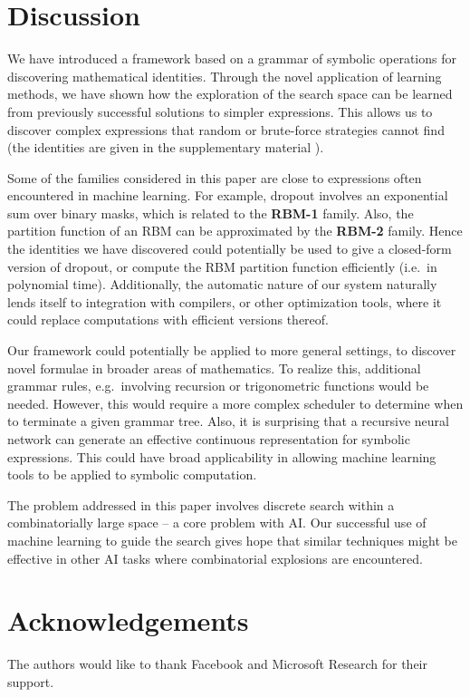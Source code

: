 \documentclass{article} %
\begin{document}
\vspace{-3mm}
\section{Discussion}
\vspace{-2mm}
\label{sec:discussion}
We have introduced a framework based on a grammar of symbolic
operations for discovering mathematical identities. Through the novel
application of learning methods, we have shown how the exploration of
the search space can be learned from previously successful solutions
to simpler expressions. This allows us to discover complex expressions
that random or brute-force strategies cannot find (the identities are
given in the supplementary material \cite{arxiv}). 

Some of the families considered in this paper are close to
expressions often encountered in machine learning. For example,
dropout involves an exponential sum over binary masks, which is
related to the {\bf RBM-1} family. Also, the partition function of an
RBM can be approximated by the {\bf RBM-2} family. Hence the identities
we have discovered could potentially be used to give a closed-form
version of dropout, or compute the RBM partition function efficiently
(i.e.~in polynomial time). 
Additionally, the automatic nature of our system naturally lends itself to
integration with compilers, or other optimization tools, where it could replace computations with
efficient versions thereof.

Our framework could potentially be applied to more general settings,
to discover novel formulae in broader areas of mathematics. To
realize this, additional grammar rules, e.g.~involving
recursion or trigonometric functions would be needed. However, this
would require a more complex scheduler to determine when to terminate
a given grammar tree. 
Also, it is surprising that a recursive neural network can generate an
effective continuous representation for symbolic expressions. This
could have broad applicability in allowing machine learning tools to
be applied to symbolic computation.

The problem addressed in this paper involves discrete search within a
combinatorially large space -- a core problem with AI. Our successful
use of machine learning to guide the search gives hope that similar
techniques might be effective in other AI tasks where combinatorial
explosions are encountered.

\vspace{-2mm}
\section*{Acknowledgements}
\vspace{-2mm} 
The authors would like to thank Facebook and Microsoft Research for their support.  
\end{document}
